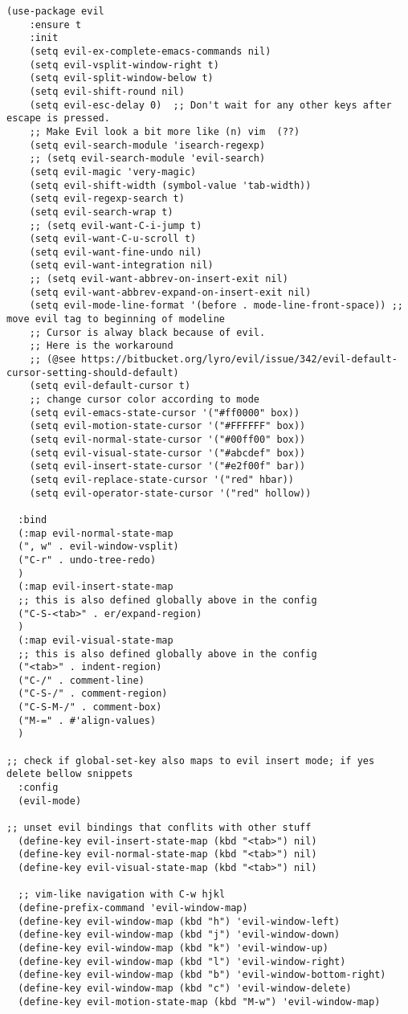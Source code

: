 \documentclass[11pt]{article}
\begin{document}
\begin{verbatim}
(use-package evil
    :ensure t
    :init
    (setq evil-ex-complete-emacs-commands nil)
    (setq evil-vsplit-window-right t)
    (setq evil-split-window-below t)
    (setq evil-shift-round nil)
    (setq evil-esc-delay 0)  ;; Don't wait for any other keys after escape is pressed.
    ;; Make Evil look a bit more like (n) vim  (??)
    (setq evil-search-module 'isearch-regexp)
    ;; (setq evil-search-module 'evil-search)
    (setq evil-magic 'very-magic)
    (setq evil-shift-width (symbol-value 'tab-width))
    (setq evil-regexp-search t)
    (setq evil-search-wrap t)
    ;; (setq evil-want-C-i-jump t)
    (setq evil-want-C-u-scroll t)
    (setq evil-want-fine-undo nil)
    (setq evil-want-integration nil)
    ;; (setq evil-want-abbrev-on-insert-exit nil)
    (setq evil-want-abbrev-expand-on-insert-exit nil)
    (setq evil-mode-line-format '(before . mode-line-front-space)) ;; move evil tag to beginning of modeline
    ;; Cursor is alway black because of evil.
    ;; Here is the workaround
    ;; (@see https://bitbucket.org/lyro/evil/issue/342/evil-default-cursor-setting-should-default)
    (setq evil-default-cursor t)
    ;; change cursor color according to mode
    (setq evil-emacs-state-cursor '("#ff0000" box))
    (setq evil-motion-state-cursor '("#FFFFFF" box))
    (setq evil-normal-state-cursor '("#00ff00" box))
    (setq evil-visual-state-cursor '("#abcdef" box))
    (setq evil-insert-state-cursor '("#e2f00f" bar))
    (setq evil-replace-state-cursor '("red" hbar))
    (setq evil-operator-state-cursor '("red" hollow))

  :bind
  (:map evil-normal-state-map
  (", w" . evil-window-vsplit)
  ("C-r" . undo-tree-redo)
  )
  (:map evil-insert-state-map
  ;; this is also defined globally above in the config
  ("C-S-<tab>" . er/expand-region)
  )
  (:map evil-visual-state-map
  ;; this is also defined globally above in the config
  ("<tab>" . indent-region)
  ("C-/" . comment-line)
  ("C-S-/" . comment-region)
  ("C-S-M-/" . comment-box)
  ("M-=" . #'align-values)
  )

;; check if global-set-key also maps to evil insert mode; if yes delete bellow snippets
  :config
  (evil-mode)

;; unset evil bindings that conflits with other stuff
  (define-key evil-insert-state-map (kbd "<tab>") nil)
  (define-key evil-normal-state-map (kbd "<tab>") nil)
  (define-key evil-visual-state-map (kbd "<tab>") nil)

  ;; vim-like navigation with C-w hjkl
  (define-prefix-command 'evil-window-map)
  (define-key evil-window-map (kbd "h") 'evil-window-left)
  (define-key evil-window-map (kbd "j") 'evil-window-down)
  (define-key evil-window-map (kbd "k") 'evil-window-up)
  (define-key evil-window-map (kbd "l") 'evil-window-right)
  (define-key evil-window-map (kbd "b") 'evil-window-bottom-right)
  (define-key evil-window-map (kbd "c") 'evil-window-delete)
  (define-key evil-motion-state-map (kbd "M-w") 'evil-window-map)


\end{verbatim}
\end{document}
